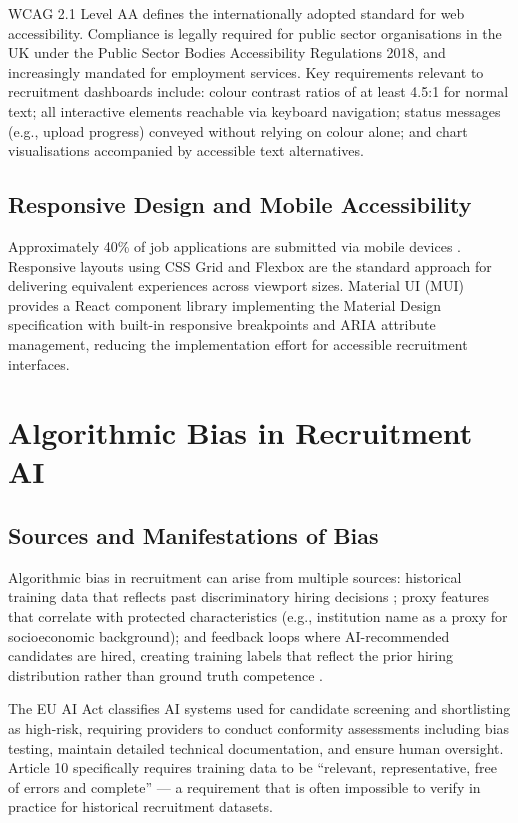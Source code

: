 WCAG 2.1 Level AA \citep{WCAG2021} defines the internationally adopted standard for web accessibility. Compliance is legally required for public sector organisations in the UK under the Public Sector Bodies Accessibility Regulations 2018, and increasingly mandated for employment services. Key requirements relevant to recruitment dashboards include: colour contrast ratios of at least 4.5:1 for normal text; all interactive elements reachable via keyboard navigation; status messages (e.g., upload progress) conveyed without relying on colour alone; and chart visualisations accompanied by accessible text alternatives.

\subsection{Responsive Design and Mobile Accessibility}

Approximately 40\% of job applications are submitted via mobile devices \citep{LinkedIn2022}. Responsive layouts using CSS Grid and Flexbox are the standard approach for delivering equivalent experiences across viewport sizes. Material UI (MUI) \citep{MUI2023} provides a React component library implementing the Material Design specification with built-in responsive breakpoints and ARIA attribute management, reducing the implementation effort for accessible recruitment interfaces.

\section{Algorithmic Bias in Recruitment AI}
\label{sec:bias}

\subsection{Sources and Manifestations of Bias}

Algorithmic bias in recruitment can arise from multiple sources: historical training data that reflects past discriminatory hiring decisions \citep{Dastin2018}; proxy features that correlate with protected characteristics (e.g., institution name as a proxy for socioeconomic background); and feedback loops where AI-recommended candidates are hired, creating training labels that reflect the prior hiring distribution rather than ground truth competence \citep{Barocas2016}.

The EU AI Act \citep{EUAIAct2024} classifies AI systems used for candidate screening and shortlisting as high-risk, requiring providers to conduct conformity assessments including bias testing, maintain detailed technical documentation, and ensure human oversight. Article 10 specifically requires training data to be ``relevant, representative, free of errors and complete'' --- a requirement that is often impossible to verify in practice for historical recruitment datasets.

